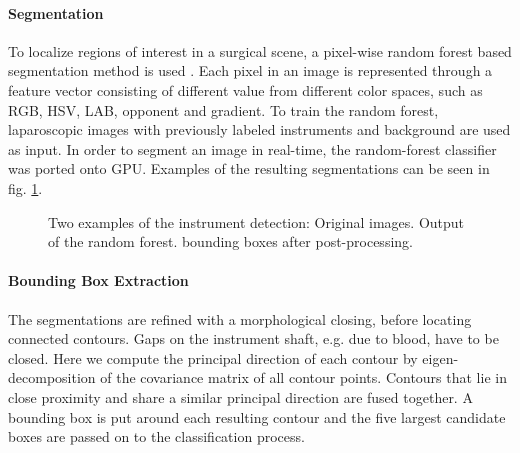 \documentclass{llncs}
\begin{document}
\paragraph{Segmentation}
To localize regions of interest in a surgical scene, a pixel-wise random forest based segmentation method is used \cite{schroff2008object}.
Each pixel in an image is represented through a feature vector consisting of different value from different color spaces, such as RGB, HSV, LAB, opponent and gradient.
To train the random forest, laparoscopic images with previously labeled instruments and background are used as input.  %
In order to segment an image in real-time, the random-forest classifier was ported onto GPU.
Examples of the resulting segmentations can be seen in fig. \ref{ExSeg}.
\begin{figure}[tb]
{}

\caption{Two examples of the instrument detection:  Original images.  Output of the random forest.  bounding boxes after post-processing.}

\label{ExSeg}
\end{figure}
\paragraph{Bounding Box Extraction}
The segmentations are refined with a morphological closing, before locating connected contours.
Gaps on the instrument shaft, e.g. due to blood, have to be closed.
Here we compute the principal direction of each contour by eigen-decomposition of the covariance matrix of all contour points.
Contours that lie in close proximity and share a similar principal direction are fused together.
A bounding box is put around each resulting contour and the five largest candidate boxes are passed on to the classification process.
\end{document}
